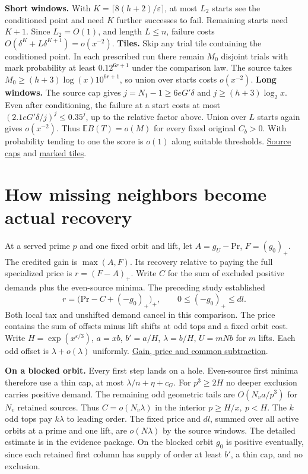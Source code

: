 \documentclass[12pt,letterpaper]{article}
\newcommand{\orig}[3]{\href{https://github.com/nousentllc/riemann-hypothesis/blob/40e56bab026552e089d7afcfeff08d2defb9c005/src/#1.lean\#L#2}{#3}}
\newcommand{\para}[1]{\par\medskip\noindent\textbf{#1}\quad}
\newcommand{\pagepart}[1]{\clearpage\section{#1}}
\begin{document}
\textbf{Short windows.} With \(K=\lceil8(h+2)/\varepsilon\rceil\), at most \(L_2\) starts see the conditioned point and need \(K\) further successes to fail. Remaining starts need \(K+1\). Since \(L_2=O(1)\), and length \(L\le n\), failure costs \(O(\delta^K+L\delta^{K+1})=o(x^{-2})\).
\textbf{Tiles.} Skip any trial tile containing the conditioned point. In each prescribed run there remain \(M_0\) disjoint trials with mark probability at least \(0.12^{6r+1}\) under the comparison law. The source takes \(M_0\ge(h+3)\log(x)10^{6r+1}\), so union over starts costs \(o(x^{-2})\).
\textbf{Long windows.} The source cap gives \(j=N_1-1\ge6eG'\delta\) and \(j\ge(h+3)\log_2x\). Even after conditioning, the failure at a start costs at most \((2.1eG'\delta/j)^j\le0.35^j\), up to the relative factor above. Union over \(L\) starts again gives \(o(x^{-2})\). Thus \(\mathbb EB(T)=o(M)\) for every fixed original \(C_b>0\). With probability tending to one the score is \(o(1)\) along suitable thresholds. \orig{Formalism/SharpRestriction/GrowthBounds/UnramifiedQuadraticSetting}{237}{Source caps} and \orig{Formalism/SubspaceCounting/GoodOrbitIntervalTileCondition}{12}{marked tiles}.

\pagepart{How missing neighbors become actual recovery}
At a served prime \(p\) and one fixed orbit and lift, let \(A=g_U-\mathrm{Pr}\), \(F=(g_0)_+\). The credited gain is \(\max(A,F)\). Its recovery relative to paying the full specialized price is \(r=(F-A)_+\). Write \(C\) for the sum of excluded positive demands plus the even-source minima. The preceding study established
\[
             r=\big(\mathrm{Pr}-C+(-g_0)_+\big)_+,\qquad
             0\le(-g_0)_+\le dl .
\]
Both local tax and unshifted demand cancel in this comparison. The price contains the sum of offsets minus lift shifts at odd tops and a fixed orbit cost. Write \(H=\exp(x^{\varepsilon/3})\), \(a=xb\), \(b'=a/H\), \(\lambda=b/H\), \(U=mNb\) for \(m\) lifts. Each odd offset is \(\lambda+o(\lambda)\) uniformly. \orig{Formalism/SharpRestriction/GrowthBounds/IsResidueClassZero}{241}{Gain, price and common subtraction}.

\para{On a blocked orbit.} Every first step lands on a hole. Even-source first minima therefore use a thin cap, at most \(\lambda/n+\eta+c_G\). For \(p^3\ge2H\) no deeper exclusion carries positive demand. The remaining odd geometric tails are \(O(N_va/p^3)\) for \(N_v\) retained sources. Thus \(C=o(N_v\lambda)\) in the interior \(p\ge H/x,\ p<H\). The \(k\) odd tops pay \(k\lambda\) to leading order. The fixed price and \(dl\), summed over all active orbits at a prime and one lift, are \(o(N\lambda)\) by the source windows. The detailed estimate is in the evidence package. On the blocked orbit \(g_0\) is positive eventually, since each retained first column has supply of order at least \(b'\), a thin cap, and no exclusion.
\end{document}
